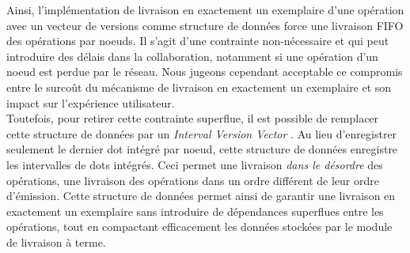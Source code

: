 Ainsi, l'implémentation de livraison en exactement un exemplaire d'une opération avec un vecteur de versions comme structure de données force une livraison \ac{FIFO} des opérations par noeuds.
Il s'agit d'une contrainte non-nécessaire et qui peut introduire des délais dans la collaboration, notamment si une opération d'un noeud est perdue par le réseau.
Nous jugeons cependant acceptable ce compromis entre le surcoût du mécanisme de livraison en exactement un exemplaire et son impact sur l'expérience utilisateur.\\

Toutefois, pour retirer cette contrainte superflue, il est possible de remplacer cette structure de données par un \emph{Interval Version Vector} \cite{2014-optimized-or-sets}.
Au lieu d'enregistrer seulement le dernier dot intégré par noeud, cette structure de données enregistre les intervalles de dots intégrés.
Ceci permet une livraison \emph{dans le désordre} des opérations, \ie une livraison des opérations dans un ordre différent de leur ordre d'émission.
Cette structure de données permet ainsi de garantir une livraison en exactement un exemplaire sans introduire de dépendances superflues entre les opérations, tout en compactant efficacement les données stockées par le module de livraison à terme.
